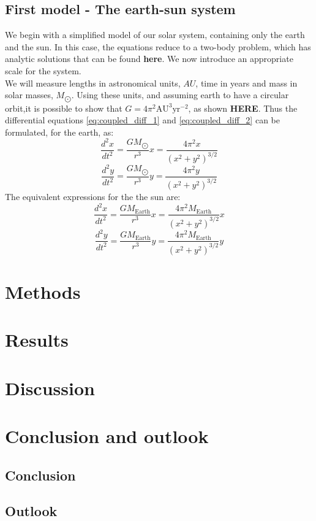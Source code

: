 \documentclass[a4paper, 10pt]{article}
\begin{document}
\subsection{First model - The earth-sun system}\label{First_model}
We begin with a simplified model of our solar system, containing only the earth and the sun. In this case, the equations reduce to a two-body problem, which has analytic solutions that can be found \textbf{here}. We now introduce an appropriate scale for the system.\\
\linebreak
We will measure lengths in astronomical units, $AU$, time in years and mass in solar masses, $M_{\bigodot}$. Using these units, and assuming earth to have a circular orbit,it is possible to show that $G=4\pi^2 \mathrm{AU^3 yr^{-2}}$, as shown \textbf{HERE}. Thus the differential equations \ref{eq:coupled_diff_1} and \ref{eq:coupled_diff_2} can be formulated, for the earth, as:
$$\frac{d^2x}{dt^2}=\frac{GM_{\bigodot}}{r^3}x=\frac{4\pi^2 x}{(x^2+y^2)^{3/2}}$$
$$\frac{d^2y}{dt^2}=\frac{GM_{\bigodot}}{r^3}y=\frac{4\pi^2 y}{(x^2+y^2)^{3/2}}$$
The equivalent expressions for the the sun are:
$$\frac{d^2x}{dt^2}=\frac{GM_{\mathrm{Earth}}}{r^3}x=\frac{4\pi^2 M_{\mathrm{Earth}} }{(x^2+y^2)^{3/2}}x$$
$$\frac{d^2y}{dt^2}=\frac{GM_{\mathrm{Earth}}}{r^3}y=\frac{4\pi^2 M_{\mathrm{Earth}} }{(x^2+y^2)^{3/2}}y$$

\section{Methods}
\section{Results}
\section{Discussion}
\section{Conclusion and outlook}
\subsection{Conclusion}
\subsection{Outlook}
\end{document}
